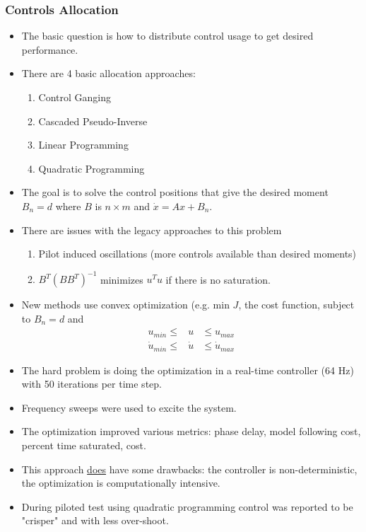 \documentclass{article}
\begin{document}
\subsubsection{Controls Allocation}
\begin{itemize}
\item The basic question is how to distribute control usage to get desired performance.
\item There are 4 basic allocation approaches:
\begin{enumerate}
\item Control Ganging
\item Cascaded Pseudo-Inverse
\item Linear Programming
\item Quadratic Programming
\end{enumerate}
\item The goal is to solve the control positions that give the desired moment $B_n = d$ where $B$ is $n \times m$ and $\dot{x} = Ax +B_n$.
\item There are issues with the legacy approaches to this problem
\begin{enumerate}
\item Pilot induced oscillations (more controls available than desired moments)
\item $B^T(BB^T)^{-1}$ minimizes $u^Tu$ if there is no saturation.
\end{enumerate}
\item New methods use convex optimization (e.g. min $J$, the cost function, subject to $B_n = d$ and \begin{eqnarray*}
u_{min} \leq &u& \leq u_{max}\\
\dot{u}_{min} \leq &\dot{u}& \leq \dot{u}_{max}
\end{eqnarray*}
\item The hard problem is doing the optimization in a real-time controller (64 Hz) with 50 iterations per time step.
\item Frequency sweeps were used to excite the system.
\item The optimization improved various metrics: phase delay, model following cost, percent time saturated, cost.
\item This approach \underline{does} have some drawbacks: the controller is non-deterministic, the optimization is computationally intensive.
\item During piloted test using quadratic programming control was reported to be "crisper" and with less over-shoot.
\end{itemize}
\end{document}

